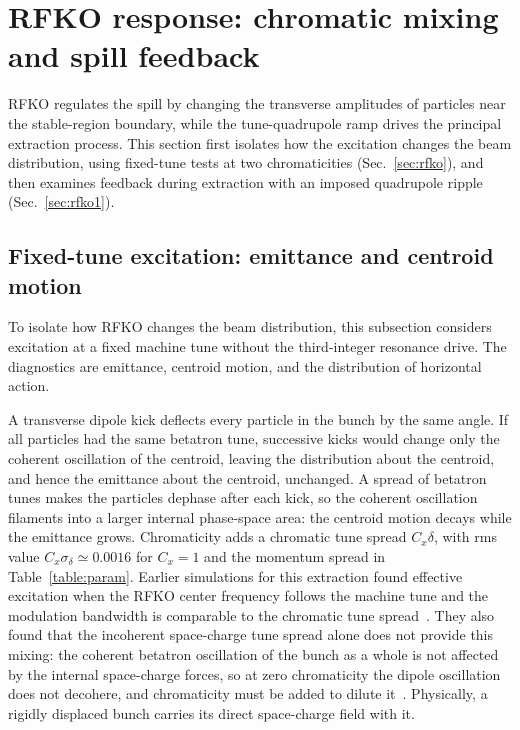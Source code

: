 \documentclass[a4paper,fleqn]{cas-sc}
\begin{document}
\section{\label{sec:rfkoresp}RFKO response: chromatic mixing and spill feedback}

RFKO regulates the spill by changing the transverse amplitudes of particles near the stable-region boundary, while the tune-quadrupole ramp drives the principal extraction process. This section first isolates how the excitation changes the beam distribution, using fixed-tune tests at two chromaticities (Sec.~\ref{sec:rfko}), and then examines feedback during extraction with an imposed quadrupole ripple (Sec.~\ref{sec:rfko1}).

\subsection{\label{sec:rfko}Fixed-tune excitation: emittance and centroid motion}

To isolate how RFKO changes the beam distribution, this subsection considers excitation at a fixed machine tune without the third-integer resonance drive. The diagnostics are emittance, centroid motion, and the distribution of horizontal action.

A transverse dipole kick deflects every particle in the bunch by the same angle. If all particles had the same betatron tune, successive kicks would change only the coherent oscillation of the centroid, leaving the distribution about the centroid, and hence the emittance about the centroid, unchanged. A spread of betatron tunes makes the particles dephase after each kick, so the coherent oscillation filaments into a larger internal phase-space area: the centroid motion decays while the emittance grows. Chromaticity adds a chromatic tune spread $C_x\delta$, with rms value $C_x\sigma_\delta\simeq0.0016$ for $C_x=1$ and the momentum spread in Table~\ref{table:param}. Earlier simulations for this extraction found effective excitation when the RFKO center frequency follows the machine tune and the modulation bandwidth is comparable to the chromatic tune spread~\cite{ipac11}. They also found that the incoherent space-charge tune spread alone does not provide this mixing: the coherent betatron oscillation of the bunch as a whole is not affected by the internal space-charge forces, so at zero chromaticity the dipole oscillation does not decohere, and chromaticity must be added to dilute it~\cite{ipac11}. Physically, a rigidly displaced bunch carries its direct space-charge field with it.
\end{document}
